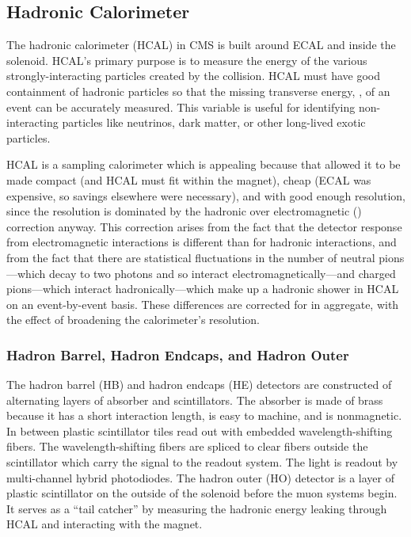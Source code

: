 \subsection{Hadronic Calorimeter}

The hadronic calorimeter (HCAL) in CMS is built around ECAL and inside the
solenoid. HCAL's primary purpose is to measure the energy of the various
strongly-interacting particles created by the collision. HCAL must have good
containment of hadronic particles so that the missing transverse energy, \MET,
of an event can be accurately measured. This variable is useful for identifying
non-interacting particles like neutrinos, dark matter, or other long-lived
exotic particles.

HCAL is a sampling calorimeter which is appealing because that allowed it to be
made compact (and HCAL must fit within the magnet), cheap (ECAL was expensive,
so savings elsewhere were necessary), and with good enough resolution, since
the resolution is dominated by the hadronic over electromagnetic (\HOverE)
correction anyway. This correction arises from the fact that the detector
response from electromagnetic interactions is different than for hadronic
interactions, and from the fact that there are statistical fluctuations in the
number of neutral pions---which decay to two photons and so interact
electromagnetically---and charged pions---which interact hadronically---which
make up a hadronic shower in HCAL on an event-by-event basis. These differences
are corrected for in aggregate, with the effect of broadening the calorimeter's
resolution.

\subsubsection{Hadron Barrel, Hadron Endcaps, and Hadron Outer}

The hadron barrel (HB) and hadron endcaps (HE) detectors are constructed of
alternating layers of absorber and scintillators. The absorber is made of brass
because it has a short interaction length, is easy to machine, and is
nonmagnetic. In between plastic scintillator tiles read out with embedded
wavelength-shifting fibers. The wavelength-shifting fibers are spliced to clear
fibers outside the scintillator which carry the signal to the readout system.
The light is readout by multi-channel hybrid photodiodes. The hadron outer (HO)
detector is a layer of plastic scintillator on the outside of the solenoid
before the muon systems begin. It serves as a ``tail catcher'' by measuring the
hadronic energy leaking through HCAL and interacting with the magnet.

